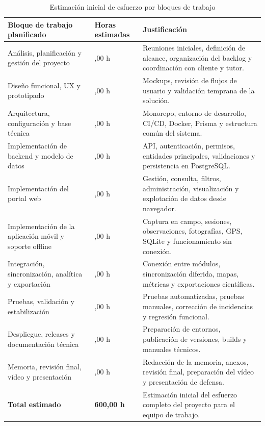\begin{table}[H]
\centering
\caption{Estimación inicial de esfuerzo por bloques de trabajo}
\label{tab:estimacion_inicial_esfuerzo}
\small
\renewcommand{\arraystretch}{1.18}
\begin{tabularx}{\textwidth}{X>{\raggedleft\arraybackslash}p{2.4cm}X}
\toprule
\textbf{Bloque de trabajo planificado} & \textbf{Horas estimadas} & \textbf{Justificación} \\
\midrule
Análisis, planificación y gestión del proyecto & 48,00 h & Reuniones iniciales, definición de alcance, organización del backlog y coordinación con cliente y tutor. \\
Diseño funcional, UX y prototipado & 48,00 h & Mockups, revisión de flujos de usuario y validación temprana de la solución. \\
Arquitectura, configuración y base técnica & 62,00 h & Monorepo, entorno de desarrollo, CI/CD, Docker, Prisma y estructura común del sistema. \\
Implementación de backend y modelo de datos & 72,00 h & API, autenticación, permisos, entidades principales, validaciones y persistencia en PostgreSQL. \\
Implementación del portal web & 58,00 h & Gestión, consulta, filtros, administración, visualización y explotación de datos desde navegador. \\
Implementación de la aplicación móvil y soporte offline & 82,00 h & Captura en campo, sesiones, observaciones, fotografías, GPS, SQLite y funcionamiento sin conexión. \\
Integración, sincronización, analítica y exportación & 68,00 h & Conexión entre módulos, sincronización diferida, mapas, métricas y exportaciones científicas. \\
Pruebas, validación y estabilización & 52,00 h & Pruebas automatizadas, pruebas manuales, corrección de incidencias y regresión funcional. \\
Despliegue, releases y documentación técnica & 32,00 h & Preparación de entornos, publicación de versiones, builds y manuales técnicos. \\
Memoria, revisión final, vídeo y presentación & 78,00 h & Redacción de la memoria, anexos, revisión final, preparación del vídeo y presentación de defensa. \\
\midrule
\textbf{Total estimado} & \textbf{600,00 h} & Estimación inicial del esfuerzo completo del proyecto para el equipo de trabajo. \\
\bottomrule
\end{tabularx}
\end{table}

